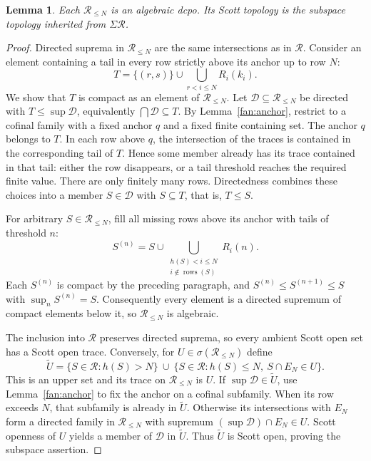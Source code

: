 \documentclass[10pt,a4paper]{article}
\newtheorem{lemma}[theorem]{Lemma}
\theoremstyle{definition}
\newcommand{\RR}{\mathcal R}
\newcommand{\rows}{\operatorname{rows}}
\begin{document}
\begin{lemma}\label{fan:truncations}
Each $\RR_{\leq N}$ is an algebraic dcpo. Its Scott topology is the subspace topology inherited from $\Sigma\RR$.
\end{lemma}
\begin{proof}
Directed suprema in $\RR_{\leq N}$ are the same intersections as in $\RR$. Consider an element containing a tail in every row strictly above its anchor up to row $N$:
\[
 T=\{(r,s)\}\cup\bigcup_{r<i\leq N}R_i(k_i).
\]
We show that $T$ is compact as an element of $\RR_{\leq N}$. Let $\mathcal D\subseteq\RR_{\leq N}$ be directed with $T\leq\sup\mathcal D$, equivalently $\bigcap\mathcal D\subseteq T$. By Lemma~\ref{fan:anchor}, restrict to a cofinal family with a fixed anchor $q$ and a fixed finite containing set. The anchor $q$ belongs to $T$. In each row above $q$, the intersection of the traces is contained in the corresponding tail of $T$. Hence some member already has its trace contained in that tail: either the row disappears, or a tail threshold reaches the required finite value. There are only finitely many rows. Directedness combines these choices into a member $S\in\mathcal D$ with $S\subseteq T$, that is, $T\leq S$.

For arbitrary $S\in\RR_{\leq N}$, fill all missing rows above its anchor with tails of threshold $n$:
\[
 S^{(n)}=S\cup
 \bigcup_{\substack{h(S)<i\leq N\\i\notin\rows(S)}}R_i(n).
\]
Each $S^{(n)}$ is compact by the preceding paragraph, and $S^{(n)}\leq S^{(n+1)}\leq S$ with $\sup_n S^{(n)}=S$. Consequently every element is a directed supremum of compact elements below it, so $\RR_{\leq N}$ is algebraic.

The inclusion into $\RR$ preserves directed suprema, so every ambient Scott open set has a Scott open trace. Conversely, for $U\in\sigma(\RR_{\leq N})$ define
\[
 \widetilde U
 =\{S\in\RR:h(S)>N\}
 \ \cup\
 \{S\in\RR:h(S)\leq N,\ S\cap E_N\in U\}.
\]
This is an upper set and its trace on $\RR_{\leq N}$ is $U$. If $\sup\mathcal D\in\widetilde U$, use Lemma~\ref{fan:anchor} to fix the anchor on a cofinal subfamily. When its row exceeds $N$, that subfamily is already in $\widetilde U$. Otherwise its intersections with $E_N$ form a directed family in $\RR_{\leq N}$ with supremum $(\sup\mathcal D)\cap E_N\in U$. Scott openness of $U$ yields a member of $\mathcal D$ in $\widetilde U$. Thus $\widetilde U$ is Scott open, proving the subspace assertion.
\end{proof}
\end{document}
